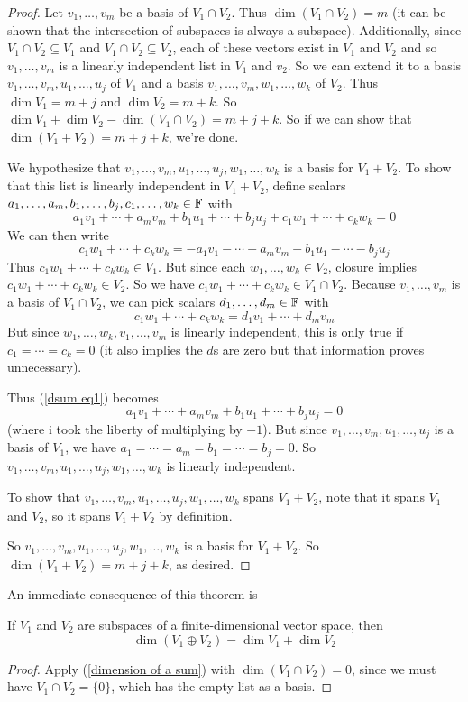 \begin{proof}
    Let $v_1, \dots, v_m$ be a basis of $V_1\cap V_2$. Thus $\dim(V_1\cap V_2) = m$ (it can be shown that the intersection of subspaces is always a subspace). Additionally, since $V_1\cap V_2\subseteq V_1$ and $V_1\cap V_2\subseteq V_2$, each of these vectors exist in $V_1$ and $V_2$ and so $v_1, \dots, v_m$ is a linearly independent list in $V_1$ and $v_2$. So we can extend it to a basis $v_1, \dots, v_m, u_1, \dots, u_j$ of $V_1$ and a basis $v_1, \dots, v_m, w_1, \dots, w_k$ of $V_2$. Thus $\dim V_1 = m + j$ and $\dim V_2 = m + k$. So $\dim V_1 + \dim V_2 - \dim(V_1\cap V_2) = m + j + k$. So if we can show that $\dim(V_1+V_2) = m+j+k$, we're done.

    We hypothesize that $v_1, \dots, v_m, u_1, \dots, u_j, w_1, \dots, w_k$ is a basis for $V_1+V_2$. To show that this list is linearly independent in $V_1+V_2$, define scalars $a_1, \dots, a_m, b_1, \dots, b_j, c_1, \dots, w_k\in \mathbb F$ with
    \begin{equation*} 
         a_1v_1 + \cdots + a_mv_m + b_1u_1 +\cdots + b_ju_j + c_1w_1 + \cdots + c_kw_k = 0
    \end{equation*}
    We can then write
    \begin{equation} \label{dsum eq1}
        c_1w_1 + \cdots + c_kw_k = -a_1v_1 - \cdots - a_mv_m - b_1u_1 - \cdots - b_ju_j
    \end{equation}
    Thus $c_1w_1 + \cdots + c_kw_k \in V_1$. But since each $w_1, \dots, w_k\in V_2$, closure implies $c_1w_1 + \cdots + c_kw_k \in V_2$. So we have $c_1w_1 + \cdots + c_kw_k \in V_1\cap V_2$. Because $v_1, \dots, v_m$ is a basis of $V_1\cap V_2$, we can pick scalars $d_1, \dots, d_m\in \mathbb F$ with
    \[ c_1w_1 + \cdots + c_kw_k = d_1v_1 + \cdots + d_mv_m\]
    But since $w_1, \dots, w_k, v_1, \dots, v_m$ is linearly independent, this is only true if $c_1 = \cdots = c_k = 0$ (it also implies the $d$s are zero but that information proves unnecessary).
    
    Thus (\ref{dsum eq1}) becomes
    \[ a_1v_1 + \cdots + a_mv_m + b_1u_1 + \cdots + b_ju_j = 0 \]
    (where i took the liberty of multiplying by $-1$). But since $v_1, \dots, v_m, u_1, \dots, u_j$ is a basis of $V_1$, we have  $a_1 = \cdots = a_m = b_1 = \cdots = b_j = 0$. So $v_1, \dots, v_m, u_1, \dots, u_j, w_1, \dots, w_k$ is linearly independent.

    To show that $v_1, \dots, v_m, u_1, \dots, u_j, w_1, \dots, w_k$ spans $V_1+V_2$, note that it spans $V_1$ and $V_2$, so it spans $V_1+V_2$ by definition.

    So $v_1, \dots, v_m, u_1, \dots, u_j, w_1, \dots, w_k$ is a basis for $V_1+V_2$. So $\dim(V_1+V_2) = m+j+k$, as desired.
\end{proof}
An immediate consequence of this theorem is
\begin{theorem}
    If $V_1$ and $V_2$ are subspaces of a finite-dimensional vector space, then
    \[ \dim(V_1 \oplus V_2) = \dim V_1 + \dim V_2\]
\end{theorem}
\begin{proof}
    Apply (\ref{dimension of a sum}) with $\dim(V_1\cap V_2) = 0$, since we must have $V_1\cap V_2 = \{0\}$, which has the empty list as a basis.
\end{proof}